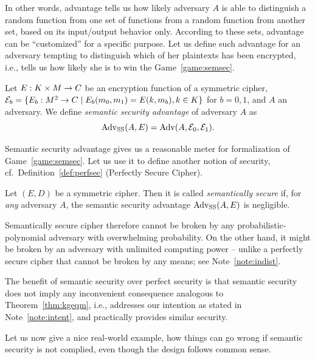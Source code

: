 In other words, advantage tells us how likely adversary $A$ is able to distinguish a random function from one set of functions from a random function from another set, based on its input/output behavior only. According to these sets, advantage can be ``customized'' for a specific purpose. Let us define such advantage for an adversary tempting to distinguish which of her plaintexts has been encrypted, i.e., tells us how likely she is to win the Game~\ref{game:semsec}.

\begin{defn}
\label{def:ssadvant}
	Let $E: K\times M\rightarrow C$ be an encryption function of a symmetric cipher, ${\cal E}_b = \{E_b:M^2\rightarrow C \mid E_b(m_0,m_1) = E(k,m_b), k\in K\}$ for $b=0,1$, and $A$ an adversary. We define {\em semantic security advantage} of adversary $A$ as
	\[
		\operatorname*{Adv_{SS}}(A,E) = \operatorname*{Adv}(A,{\cal E}_0,{\cal E}_1) .
	\]
\end{defn}

Semantic security advantage gives us a reasonable meter for formalization of Game~\ref{game:semsec}. Let us use it to define another notion of security, cf.\ Definition~\ref{def:perfsec} (Perfectly Secure Cipher).

\begin{defn}
\label{def:semsec}
	Let $(E,D)$ be a symmetric cipher. Then it is called {\em semantically secure} if, for {\em any} adversary $A$, the semantic security advantage $\operatorname*{Adv_{SS}}(A,E)$ is negligible.
\end{defn}

Semantically secure cipher therefore cannot be broken by any probabilistic-polynomial adversary with overwhelming probability. On the other hand, it might be broken by an adversary with unlimited computing power -- unlike a perfectly secure cipher that cannot be broken by any means; see Note~\ref{note:indist}.

The benefit of semantic security over perfect security is that semantic security does not imply any inconvenient consequence analogous to Theorem~\ref{thm:kgeqm}, i.e., addresses our intention as stated in Note~\ref{note:intent}, and practically provides similar security.

Let us now give a nice real-world example, how things can go wrong if semantic security is not complied, even though the design follows common sense.

